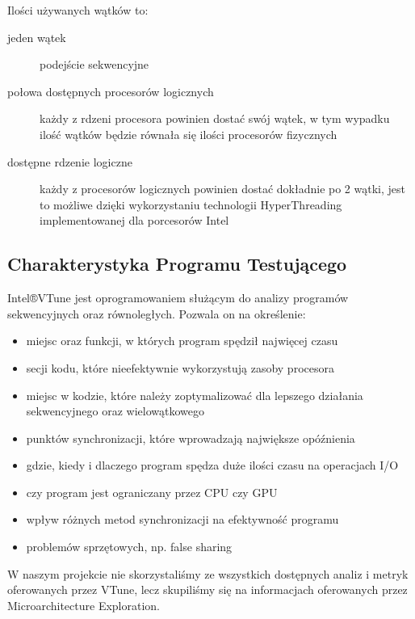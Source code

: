 \documentclass{article}
\begin{document}
                \noindent
                Ilości używanych wątków to:
                \begin{description}
                    \item[jeden wątek] podejście sekwencyjne
                    \item[połowa dostępnych procesorów logicznych] każdy z rdzeni procesora powinien dostać swój wątek, w tym wypadku ilość wątków będzie równała się ilości procesorów fizycznych
                    \item[dostępne rdzenie logiczne] każdy z procesorów logicznych powinien dostać dokładnie po 2 wątki, jest to możliwe dzięki wykorzystaniu technologii HyperThreading implementowanej dla porcesorów Intel
                \end{description}
        
        \subsection{Charakterystyka Programu Testującego}
            Intel®VTune jest oprogramowaniem służącym do analizy programów sekwencyjnych oraz równoległych. Pozwala on na określenie:
            \begin{itemize}
                \item miejsc oraz funkcji, w których program spędził najwięcej czasu
                \item secji kodu, które nieefektywnie wykorzystują zasoby procesora
                \item miejsc w kodzie, które należy zoptymalizować dla lepszego działania sekwencyjnego oraz wielowątkowego
                \item punktów synchronizacji, które wprowadzają największe opóźnienia
                \item gdzie, kiedy i dlaczego program spędza duże ilości czasu na operacjach I/O
                \item czy program jest ograniczany przez CPU czy GPU
                \item wpływ różnych metod synchronizacji na efektywność programu
                \item problemów sprzętowych, np. false sharing
            \end{itemize}
            W naszym projekcie nie skorzystaliśmy ze wszystkich dostępnych analiz i metryk oferowanych przez VTune, lecz skupiliśmy się na informacjach oferowanych przez Microarchitecture Exploration.
        
\end{document}
